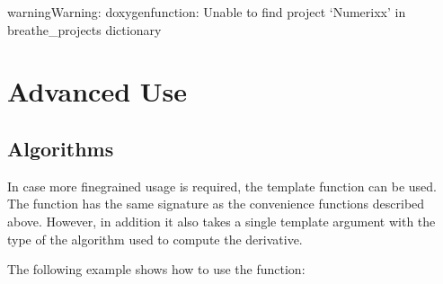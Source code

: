 \documentclass[letterpaper,10pt,english]{sphinxmanual}
\begin{document}
\begin{sphinxadmonition}{warning}{Warning:}
\sphinxAtStartPar
doxygenfunction: Unable to find project ‘Numerixx’ in breathe\_projects dictionary
\end{sphinxadmonition}


\section{Advanced Use}
\label{\detokenize{docDerivative:advanced-use}}

\subsection{Algorithms}
\label{\detokenize{docDerivative:algorithms}}
\sphinxAtStartPar
In case more fine\sphinxhyphen{}grained usage is required, the  template function can be used. The  function has the same signature as the convenience functions described above. However, in addition it also takes a single template argument with the type of the algorithm used to compute the derivative.

\sphinxAtStartPar
The following example shows how to use the function:

\begin{sphinxVerbatim}[commandchars=\\\{\}]

\PYG{p}{[}\PYG{p}{]}
\end{sphinxVerbatim}
\end{document}
